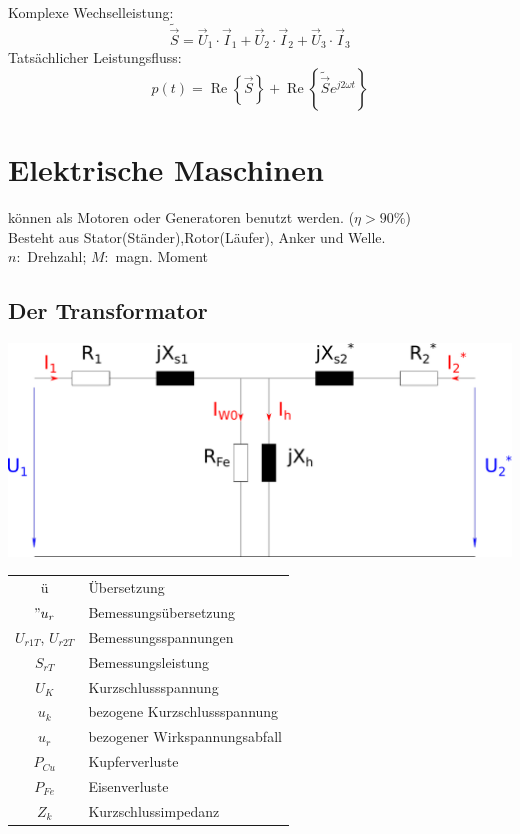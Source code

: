 \documentclass[fs, footer]{latex4ei}
\begin{document}
\begin{multicols}{4}
    Komplexe Wechselleistung:
    \[\tilde{\vec S} = \vec U_1 \cdot \vec I_1 + \vec U_2 \cdot \vec I_2 + \vec U_3 \cdot \vec I_3\]
    Tatsächlicher Leistungsfluss:
    \[p(t) = \operatorname{Re} \left\{ \vec S \right\} + \operatorname{Re} \left\{\tilde{\vec S} e^{j 2 \omega t} \right\}\]


    \section{Elektrische Maschinen}
    können als Motoren oder Generatoren benutzt werden. ($\eta > 90\%$)\\
    Besteht aus Stator(Ständer),Rotor(Läufer), Anker und Welle.\\
    $n:$ Drehzahl; $M:$ magn. Moment\\


    \subsection{Der Transformator}

    \includegraphics[scale=.2]{./img/ersatzschaltbild_transformator.pdf} \\

    \begin{tabular}{cl}
        ü                    & Übersetzung                   \\
        $"u_r$               & Bemessungsübersetzung         \\
        $U_{r1T}$, $U_{r2T}$ & Bemessungsspannungen          \\
        $S_{rT}$             & Bemessungsleistung            \\
        $U_{K}$              & Kurzschlussspannung           \\
        $u_k$                & bezogene Kurzschlussspannung  \\
        $u_r$                & bezogener Wirkspannungsabfall \\
        $P_{Cu}$             & Kupferverluste                \\
        $P_{Fe}$             & Eisenverluste                 \\
        $Z_k$                & Kurzschlussimpedanz
    \end{tabular}


\end{multicols}
\end{document}
